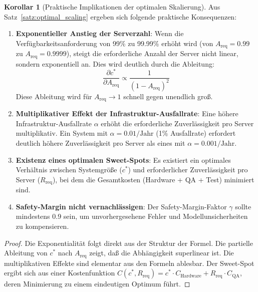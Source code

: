 \documentclass[a4paper,11pt]{article}
\theoremstyle{definition}
\newtheorem{korollar}{Korollar}
\newenvironment{beweis}{\begin{proof}}{\end{proof}}
\begin{document}
\begin{korollar}[Praktische Implikationen der optimalen Skalierung]
    \label{kor:scaling_practical}
    Aus Satz~\ref{satz:optimal_scaling} ergeben sich folgende praktische Konsequenzen:

    \begin{enumerate}
        \item \textbf{Exponentieller Anstieg der Serverzahl}:
              Wenn die Verfügbarkeitsanforderung von 99\% zu 99.99\% erhöht wird 
              (von $A_{\text{req}} = 0.99$ zu $A_{\text{req}} = 0.9999$), steigt die erforderliche 
              Anzahl der Server nicht linear, sondern exponentiell an. Dies wird deutlich durch 
              die Ableitung:
              \[
                  \frac{\partial c^*}{\partial A_{\text{req}}} \propto \frac{1}{(1-A_{\text{req}})^2}
              \]
              Diese Ableitung wird für $A_{\text{req}} \to 1$ schnell gegen unendlich groß.

        \item \textbf{Multiplikativer Effekt der Infrastruktur-Ausfallrate}:
              Eine höhere Infrastruktur-Ausfallrate $\alpha$ erhöht die erforderliche 
              Zuverlässigkeit pro Server multiplikativ. Ein System mit $\alpha = 0.01/\text{Jahr}$ 
              (1\% Ausfallrate) erfordert deutlich höhere Zuverlässigkeit pro Server als eines 
              mit $\alpha = 0.001/\text{Jahr}$.

        \item \textbf{Existenz eines optimalen Sweet-Spots}:
              Es existiert ein optimales Verhältnis zwischen Systemgröße ($c^*$) und erforderlicher 
              Zuverlässigkeit pro Server ($R_{\text{req}}$), bei dem die Gesamtkosten 
              (Hardware + QA + Test) minimiert sind.

        \item \textbf{Safety-Margin nicht vernachlässigen}:
              Der Safety-Margin-Faktor $\gamma$ sollte mindestens 0.9 sein, um unvorhergesehene 
              Fehler und Modellunsicherheiten zu kompensieren.
    \end{enumerate}

    \begin{beweis}
        Die Exponentialität folgt direkt aus der Struktur der Formel. Die partielle Ableitung 
        von $c^*$ nach $A_{\text{req}}$ zeigt, daß die Abhängigkeit superlinear ist. Die 
        multiplikativen Effekte sind elementar aus den Formeln ablesbar. Der Sweet-Spot ergibt 
        sich aus einer Kostenfunktion $C(c^*, R_{\text{req}}) = c^* \cdot C_{\text{Hardware}} + 
        R_{\text{req}} \cdot C_{\text{QA}}$, deren Minimierung zu einem eindeutigen Optimum führt.
    \end{beweis}
\end{korollar}
\end{document}
